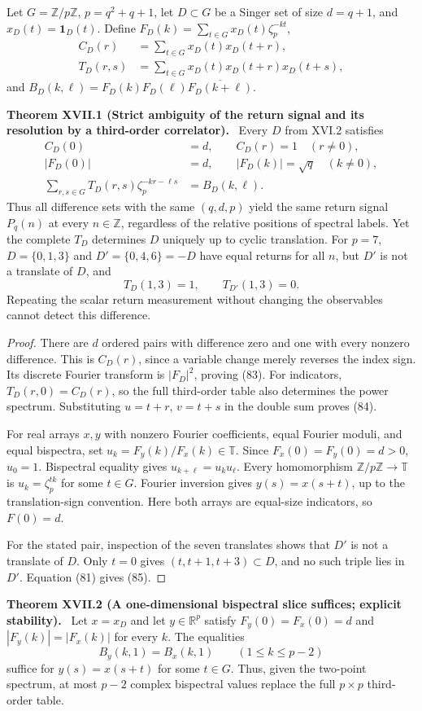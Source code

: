 \documentclass[11pt,a4paper,oneside]{book}
\newcommand{\R}{\mathbb R}\newcommand{\C}{\mathbb C}\newcommand{\Z}{\mathbb Z}\newcommand{\N}{\mathbb N}\newcommand{\Q}{\mathbb Q}
\newcommand{\one}{\mathbf 1}\newcommand{\ii}{\mathrm i}\newcommand{\dd}{\mathrm d}
\newcommand{\statement}[3]{\par\medskip\noindent\textbf{#1 #2 (#3).}\ }
\begin{document}
Let $G=\Z/p\Z$, $p=q^2+q+1$, let $D\subset G$ be a Singer set of size $d=q+1$, and $x_D(t)=\one_D(t)$. Define $F_D(k)=\sum_{t\in G}x_D(t)\zeta_p^{-kt}$,
\begin{align}C_D(r)&=\sum_{t\in G}x_D(t)x_D(t+r),\tag{80}\\
T_D(r,s)&=\sum_{t\in G}x_D(t)x_D(t+r)x_D(t+s),\tag{81}\end{align}
and $B_D(k,\ell)=F_D(k)F_D(\ell)\overline{F_D(k+\ell)}$.
\statement{Theorem}{XVII.1}{Strict ambiguity of the return signal and its resolution by a third-order correlator} Every $D$ from XVI.2 satisfies
\begin{align}C_D(0)&=d,\qquad C_D(r)=1\quad(r\ne0),\tag{82}\\
|F_D(0)|&=d,\qquad|F_D(k)|=\sqrt q\quad(k\ne0),\tag{83}\\
\sum_{r,s\in G}T_D(r,s)\zeta_p^{-kr-\ell s}&=B_D(k,\ell).\tag{84}\end{align}
Thus all difference sets with the same $(q,d,p)$ yield the same return signal $P_q(n)$ at every $n\in\Z$, regardless of the relative positions of spectral labels. Yet the complete $T_D$ determines $D$ uniquely up to cyclic translation. For $p=7$, $D=\{0,1,3\}$ and $D'=\{0,4,6\}=-D$ have equal returns for all $n$, but $D'$ is not a translate of $D$, and
\begin{equation}T_D(1,3)=1,\qquad T_{D'}(1,3)=0.\tag{85}\end{equation}
Repeating the scalar return measurement without changing the observables cannot detect this difference.
\begin{proof}There are $d$ ordered pairs with difference zero and one with every nonzero difference. This is $C_D(r)$, since a variable change merely reverses the index sign. Its discrete Fourier transform is $|F_D|^2$, proving (83). For indicators, $T_D(r,0)=C_D(r)$, so the full third-order table also determines the power spectrum. Substituting $u=t+r$, $v=t+s$ in the double sum proves (84).

For real arrays $x,y$ with nonzero Fourier coefficients, equal Fourier moduli, and equal bispectra, set $u_k=F_y(k)/F_x(k)\in\mathbb T$. Since $F_x(0)=F_y(0)=d>0$, $u_0=1$. Bispectral equality gives $u_{k+\ell}=u_ku_\ell$. Every homomorphism $\Z/p\Z\to\mathbb T$ is $u_k=\zeta_p^{tk}$ for some $t\in G$. Fourier inversion gives $y(s)=x(s+t)$, up to the translation-sign convention. Here both arrays are equal-size indicators, so $F(0)=d$.

For the stated pair, inspection of the seven translates shows that $D'$ is not a translate of $D$. Only $t=0$ gives $(t,t+1,t+3)\subset D$, and no such triple lies in $D'$. Equation (81) gives (85).\end{proof}
\statement{Theorem}{XVII.2}{A one-dimensional bispectral slice suffices; explicit stability} Let $x=x_D$ and let $y\in\R^p$ satisfy $F_y(0)=F_x(0)=d$ and $|F_y(k)|=|F_x(k)|$ for every $k$. The equalities
\begin{equation}B_y(k,1)=B_x(k,1)\qquad(1\le k\le p-2)\tag{86}\end{equation}
suffice for $y(s)=x(s+t)$ for some $t\in G$. Thus, given the two-point spectrum, at most $p-2$ complex bispectral values replace the full $p\times p$ third-order table.
\end{document}
